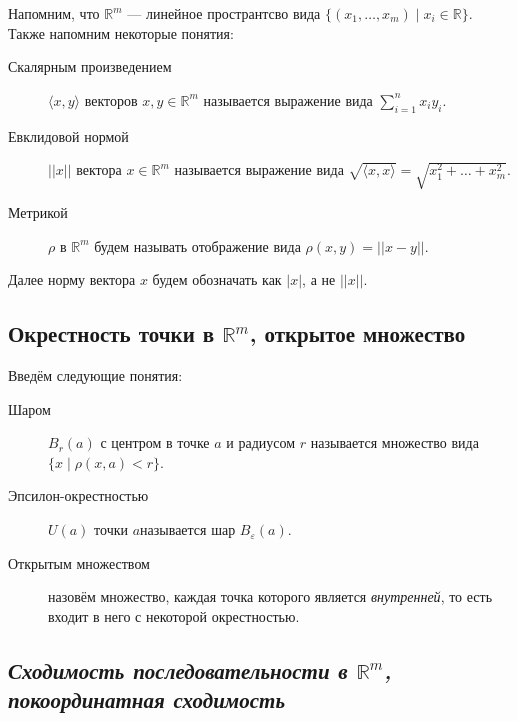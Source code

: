 \begin{definition}
	Напомним, что \(\mathbb{R}^m\) --- линейное пространтсво вида \linebreak \(\{(x_1, \ldots, x_m) \mid x_i \in \mathbb{R}\}\). Также напомним некоторые понятия:
	\begin{description}
		\item[Скалярным произведением] \(\langle x, y \rangle\) векторов \(x, y \in \mathbb{R}^m\) называется выражение вида \( \sum\limits_{i=1}^n x_i y_i\).
		\item[Евклидовой нормой] \(||x||\) вектора \(x \in \mathbb{R}^m\) называется выражение вида \linebreak \(\sqrt{\langle x, x \rangle} = \sqrt{x_1^2 + \ldots + x_m^2}\).
		\item[Метрикой] \(\rho\) в \(\mathbb{R}^m\) будем называть отображение вида \(\rho(x, y) = || x - y||\). 
	\end{description}
\end{definition}

\begin{remark}
	Далее норму вектора \(x\) будем обозначать как  \(|x|\), а не \(||x||\).
\end{remark}

\subsection{Окрестность точки в \(\mathbb{R}^m\), открытое множество}

\begin{definition}
	Введём следующие понятия:
	\begin{description}
		\item[Шаром] \(B_r (a)\) с центром в точке \(a\) и радиусом \(r\) называется множество вида \(\{x \mid \rho(x, a) < r\}\).
		\item[Эпсилон-окрестностью] \(U(a)\) точки \(a\)называется шар \(B_\varepsilon (a)\).
		\item[Открытым множеством] назовём множество, каждая точка которого является \textit{внутренней}, то есть входит в него с некоторой окрестностью.
	\end{description}
\end{definition}

\subsection{\itshape Сходимость последовательности в \(\mathbb{R}^m\), покоординатная сходимость}

